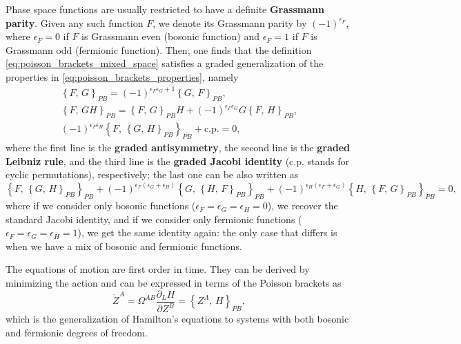 Phase space functions are usually restricted to have a definite \textbf{Grassmann parity}. Given any such function \(F\), we denote its Grassmann parity by \((-1)^{\epsilon_F}\), where \(\epsilon_F = 0\) if \(F\) is Grassmann even (bosonic function) and \(\epsilon_F = 1\) if \(F\) is Grassmann odd (fermionic function). Then, one finds that the definition \eqref{eq:poisson_brackets_mixed_space} satisfies a graded generalization of the properties in \eqref{eq:poisson_brackets_properties}, namely
\begin{equation}
    \begin{aligned}
        \left\{ F,\, G \right\}_{PB}                                                         = (-1)^{\epsilon_F \epsilon_G + 1} \left\{ G,\, F \right\}_{PB},                                \\
        \left\{ F,\, GH \right\}_{PB}                                                        = \left\{ F,\, G \right\}_{PB} H + (-1)^{\epsilon_F \epsilon_G} G \left\{ F,\, H \right\}_{PB}, \\
        (-1)^{\epsilon_F \epsilon_H} \left\{ F,\, \left\{ G,\, H \right\}_{PB} \right\}_{PB} + \text{c.p.} = 0,
    \end{aligned}
    \label{eq:graded_poisson_brackets_properties}
\end{equation}
where the first line is the \textbf{graded antisymmetry}, the second line is the \textbf{graded Leibniz rule}, and the third line is the \textbf{graded Jacobi identity} (c.p. stands for cyclic permutations), respectively; the last one can be also written as
\[
    \left\{ F,\, \left\{ G,\, H \right\}_{PB} \right\}_{PB} + (-1)^{\epsilon_F (\epsilon_G + \epsilon_H)} \left\{ G,\, \left\{ H,\, F \right\}_{PB} \right\}_{PB} + (-1)^{\epsilon_H (\epsilon_F + \epsilon_G)} \left\{ H,\, \left\{ F,\, G \right\}_{PB} \right\}_{PB} = 0,
\]
where if we consider only bosonic functions (\(\epsilon_F = \epsilon_G = \epsilon_H = 0\)), we recover the standard Jacobi identity, and if we consider only fermionic functions (\(\epsilon_F = \epsilon_G = \epsilon_H = 1\)), we get the same identity again: the only case that differs is when we have a mix of bosonic and fermionic functions.

The equations of motion are first order in time. They can be derived by minimizing the action and can be expressed in terms of the Poisson brackets as
\begin{equation}
    \dot{Z}^A = \Omega^{AB} \frac{\partial_L H}{\partial Z^B} = \left\{ Z^A,\, H \right\}_{PB},
    \label{eq:hamiltons_equations_mixed_space}
\end{equation}
which is the generalization of Hamilton’s equations to systems with both bosonic and fermionic degrees of freedom.


